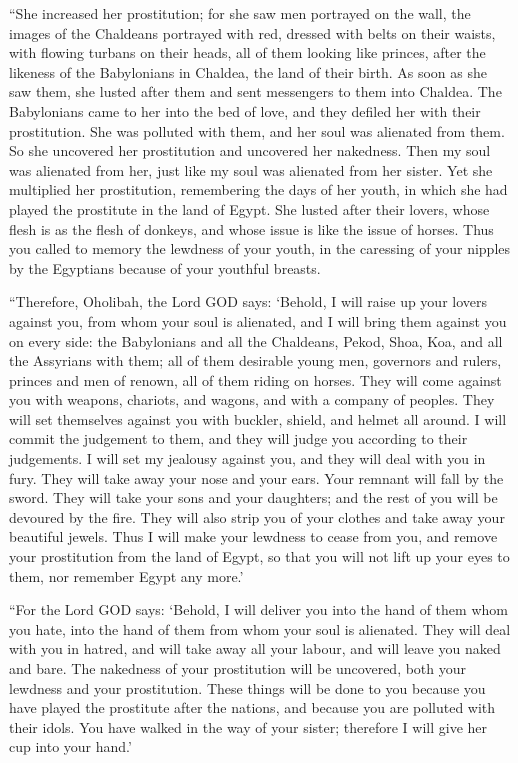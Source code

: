  ``She increased her prostitution; for she saw men
portrayed on the wall, the images of the Chaldeans portrayed with red,
 dressed with belts on their waists, with flowing turbans
on their heads, all of them looking like princes, after the likeness of
the Babylonians in Chaldea, the land of their birth.  As
soon as she saw them, she lusted after them and sent messengers to them
into Chaldea.  The Babylonians came to her into the bed
of love, and they defiled her with their prostitution. She was polluted
with them, and her soul was alienated from them.  So she
uncovered her prostitution and uncovered her nakedness. Then my soul was
alienated from her, just like my soul was alienated from her sister.
 Yet she multiplied her prostitution, remembering the
days of her youth, in which she had played the prostitute in the land of
Egypt.  She lusted after their lovers, whose flesh is as
the flesh of donkeys, and whose issue is like the issue of horses.
 Thus you called to memory the lewdness of your youth, in
the caressing of your nipples by the Egyptians because of your youthful
breasts.

 ``Therefore, Oholibah, the Lord GOD says: `Behold, I
will raise up your lovers against you, from whom your soul is alienated,
and I will bring them against you on every side:  the
Babylonians and all the Chaldeans, Pekod, Shoa, Koa, and all the
Assyrians with them; all of them desirable young men, governors and
rulers, princes and men of renown, all of them riding on horses.
 They will come against you with weapons, chariots, and
wagons, and with a company of peoples. They will set themselves against
you with buckler, shield, and helmet all around. I will commit the
judgement to them, and they will judge you according to their
judgements.  I will set my jealousy against you, and they
will deal with you in fury. They will take away your nose and your ears.
Your remnant will fall by the sword. They will take your sons and your
daughters; and the rest of you will be devoured by the fire.
 They will also strip you of your clothes and take away
your beautiful jewels.  Thus I will make your lewdness to
cease from you, and remove your prostitution from the land of Egypt, so
that you will not lift up your eyes to them, nor remember Egypt any
more.'

 ``For the Lord GOD says: `Behold, I will deliver you
into the hand of them whom you hate, into the hand of them from whom
your soul is alienated.  They will deal with you in
hatred, and will take away all your labour, and will leave you naked and
bare. The nakedness of your prostitution will be uncovered, both your
lewdness and your prostitution.  These things will be
done to you because you have played the prostitute after the nations,
and because you are polluted with their idols.  You have
walked in the way of your sister; therefore I will give her cup into
your hand.'

